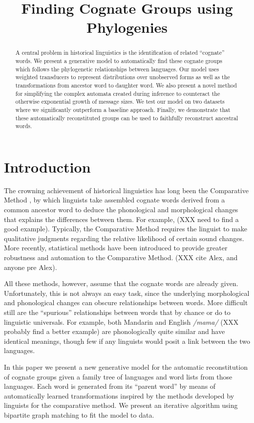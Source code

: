 \documentclass[11pt,a4paper]{article}
\title{Finding Cognate Groups using Phylogenies}
\author{}
\date{}
\begin{document}
\maketitle
\begin{abstract}
  A central problem in historical linguistics is the identification
  of related ``cognate'' words. We present a generative model to
  automatically find these cognate groups which follows the
  phylogenetic relationships between languages. Our model uses
  weighted transducers to represent distributions over unobserved
  forms as well as the transformations from ancestor word to daughter
  word. We also present a novel method for simplifying the complex
  automata created during inference to counteract the otherwise
  exponential growth of message sizes. We test our model on two
  datasets where we significantly outperform a baseline approach.
  Finally, we demonstrate that these automatically reconstituted
  groups can be used to faithfully reconstruct ancestral words.
\end{abstract}
\section{Introduction}

The crowning achievement of historical linguistics has long been
the Comparative Method \cite{ohala93phonetics}, by which
linguists take assembled cognate words derived from a common ancestor
word to deduce the phonological and morphological changes that
explains the differences between them. For example, (XXX need to
find a good example). Typically, the Comparative Method requires
the linguist to make qualitative judgments regarding the relative
likelihood of certain sound changes. More recently, statistical
methods have been introduced to provide greater robustness and
automation to the Comparative Method. (XXX cite Alex, and anyone
pre Alex).

All these methods, however, assume that the cognate words are already
given. Unfortunately, this is not always an easy task, since the
underlying morphological and phonological changes can obscure
relationships between words. More difficult still are the ``spurious''
relationships between words that by chance or do to linguistic
universals. For example, both Mandarin and English \textit{/mama/}
(XXX probably find a better example) are phonologically quite similar
and have identical meanings, though few if any linguists would posit
a link between the two languages.

In this paper we present a new generative model for the automatic
reconstitution of cognate groups given a family tree of languages
and word lists from those languages. Each word is generated from
its ``parent word'' by means of automatically learned transformations
inspired by the methods developed by linguists for the comparative
method. We present an iterative algorithm using bipartite graph matching
to fit the model to data.
\end{document}
